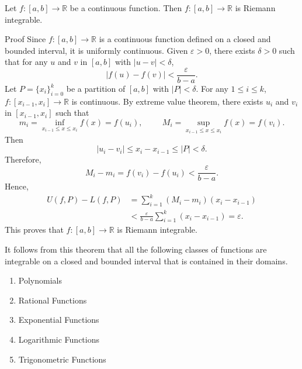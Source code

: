 \begin{theorem}[label=230221_7]{}
Let $f:[a,b]\to\mathbb{R}$ be a continuous function. Then $f:[a,b]\to\mathbb{R}$ is Riemann integrable.
\end{theorem}
\begin{myproof}{Proof}
Since  $f:[a,b]\to\mathbb{R}$ is a continuous function defined on a closed and bounded interval, it is uniformly continuous. Given $\varepsilon>0$, there exists $\delta>0$ such that for any $u$ and $v$ in $[a,b]$ with $|u-v|<\delta$,
\[|f(u)-f(v)|< \frac{\varepsilon}{b-a}.\]
Let $P=\{x_i\}_{i=0}^k$ be a partition of $[a,b]$ with $|P|<\delta$. For any $1\leq i\leq k$, $f:[x_{i-1},x_i]\to\mathbb{R}$ is continuous. By extreme value theorem, there exists $u_i$ and $v_i$ in $[x_{i-1}, x_i]$ such that
\[m_i=\inf_{x_{i-1}\leq x\leq x_i}f(x)=f(u_i),\hspace{1cm}M_i=\sup_{x_{i-1}\leq x\leq x_i}f(x)=f(v_i).\]Then
\[|u_i-v_i|\leq x_i-x_{i-1}\leq |P|<\delta.\]
Therefore,
\[M_i-m_i=f(v_i)-f(u_i)< \frac{\varepsilon}{b-a}.\]\bp
Hence,
\begin{align*}
U(f,P)-L(f,P)&=\sum_{i=1}^k (M_i-m_i)(x_i-x_{i-1}) \\&<\frac{\varepsilon}{b-a}\sum_{i=1}^k(x_i-x_{i-1}) =\varepsilon.\end{align*}
This proves that $f:[a,b]\to\mathbb{R}$ is Riemann integrable.
\end{myproof}

\begin{highlight}{}
It follows from this theorem that all the following classes of functions are integrable on a  closed and bounded interval that is contained in their domains.
\begin{enumerate}[$\bullet$\;\;]
\item Polynomials
\item Rational Functions
\item Exponential Functions
\item Logarithmic Functions
\item Trigonometric Functions

\end{enumerate}
\end{highlight} 

